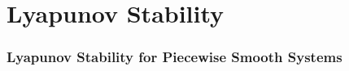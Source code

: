 \documentclass{beamer}
\begin{document}
  \section[Chapter 2]{Lyapunov Stability}
  \frame
  {
    \frametitle{Lyapunov Stability for Piecewise Smooth Systems}

    \centerline{}
  }
  
\end{document}
